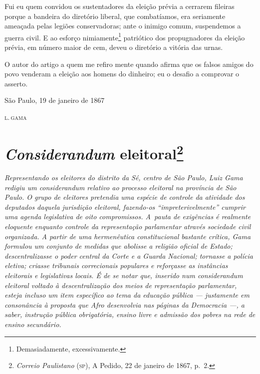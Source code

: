 Fui eu quem convidou os sustentadores da eleição prévia a cerrarem
fileiras porque a bandeira do diretório liberal, que combatíamos, era
seriamente ameaçada pelas legiões conservadoras; ante o inimigo comum,
suspendemos a guerra civil. E ao esforço nimiamente\footnote{Demasiadamente,
  excessivamente.} patriótico dos propugnadores da eleição prévia, em
número maior de cem, deveu o diretório a vitória das urnas.

O autor do artigo a quem me refiro mente quando afirma que os falsos
amigos do povo venderam a eleição aos homens do dinheiro; eu o desafio a
comprovar o asserto.

\begin{flushright}
São Paulo, 19 de janeiro de 1867

\textsc{l.\,gama}
\end{flushright}

\chapter{\emph{Considerandum} eleitoral\footnote{\emph{Correio
  Paulistano} (\textsc{sp}), A Pedido, 22 de janeiro de 1867, p.~2.}}

\begin{didascalia}\itshape
Representando os eleitores do distrito da Sé, centro de São Paulo, Luiz
Gama redigiu um \textnormal{considerandum} relativo ao processo eleitoral na
província de São Paulo. O grupo de eleitores pretendia uma espécie de
controle da atividade dos deputados daquela jurisdição eleitoral,
fazendo-os ``impreterivelmente'' cumprir uma agenda legislativa de oito
compromissos. A~pauta de exigências é realmente eloquente enquanto
controle da representação parlamentar através sociedade civil
organizada. A partir de uma hermenêutica constitucional bastante
crítica, Gama formulou um conjunto de medidas que abolisse a religião
oficial de Estado; descentralizasse o poder central da Corte e a Guarda
Nacional; tornasse a polícia eletiva; criasse tribunais correcionais
populares e reforçasse as instâncias eleitorais e legislativas locais. É
de se notar que, inserido num \textnormal{considerandum} eleitoral voltado à
descentralização dos meios de representação parlamentar, esteja incluso
um item específico ao tema da educação pública --- justamente em
consonância à proposta que Afro desenvolvia nas páginas da
\textnormal{Democracia} ---, a saber, instrução pública obrigatória, ensino
livre e admissão dos pobres na rede de ensino secundário.
\end{didascalia}



